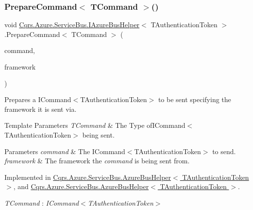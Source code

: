\subsubsection{\texorpdfstring{Prepare\+Command$<$ T\+Command $>$()}{PrepareCommand< TCommand >()}}
{\footnotesize\ttfamily void \hyperlink{interfaceCqrs_1_1Azure_1_1ServiceBus_1_1IAzureBusHelper}{Cqrs.\+Azure.\+Service\+Bus.\+I\+Azure\+Bus\+Helper}$<$ T\+Authentication\+Token $>$.Prepare\+Command$<$ T\+Command $>$ (\begin{DoxyParamCaption}\item[{T\+Command}]{command,  }\item[{string}]{framework }\end{DoxyParamCaption})}



Prepares a I\+Command$<$\+T\+Authentication\+Token$>$ to be sent specifying the framework it is sent via. 


\begin{DoxyTemplParams}{Template Parameters}
{\em T\+Command} & The Type ofI\+Command$<$\+T\+Authentication\+Token$>$ being sent.\\
\hline
\end{DoxyTemplParams}

\begin{DoxyParams}{Parameters}
{\em command} & The I\+Command$<$\+T\+Authentication\+Token$>$ to send.\\
\hline
{\em framework} & The framework the {\itshape command}  is being sent from.\\
\hline
\end{DoxyParams}


Implemented in \hyperlink{classCqrs_1_1Azure_1_1ServiceBus_1_1AzureBusHelper_abdcc74e09f97a259f16d04e2af454002_abdcc74e09f97a259f16d04e2af454002}{Cqrs.\+Azure.\+Service\+Bus.\+Azure\+Bus\+Helper$<$ T\+Authentication\+Token $>$}, and \hyperlink{classCqrs_1_1Azure_1_1ServiceBus_1_1AzureBusHelper_abdcc74e09f97a259f16d04e2af454002_abdcc74e09f97a259f16d04e2af454002}{Cqrs.\+Azure.\+Service\+Bus.\+Azure\+Bus\+Helper$<$ T\+Authentication\+Token $>$}.

\begin{Desc}
\item[Type Constraints]\begin{description}
\item[{\em T\+Command} : {\em I\+Command$<$T\+Authentication\+Token$>$}]\end{description}
\end{Desc}
\mbox{\label{interfaceCqrs_1_1Azure_1_1ServiceBus_1_1IAzureBusHelper_ab7d1fa5162adc0f01edcf9039bb43c2c_ab7d1fa5162adc0f01edcf9039bb43c2c}} 
